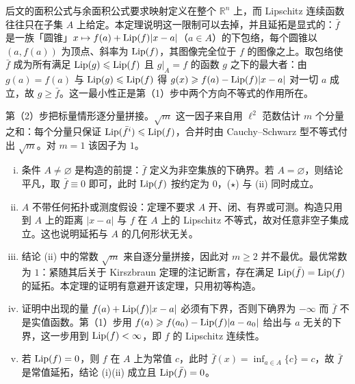 \documentclass[../../main.tex]{subfiles}%
\begin{document}
\begin{remark}\label{remark:ch03-thm-3-1-动机}
后文的面积公式与余面积公式要求映射定义在整个 $\mathbb{R}^n$ 上，而 Lipschitz 连续函数往往只在子集 $A$ 上给定。本定理说明这一限制可以去掉，并且延拓是显式的：$\bar f$ 是一族「圆锥」$x\mapsto f(a)+\operatorname{Lip}(f)\lvert x-a\rvert$（$a\in A$）的下包络，每个圆锥以 $(a,f(a))$ 为顶点、斜率为 $\operatorname{Lip}(f)$，其图像完全位于 $f$ 的图像之上。取包络使 $\bar f$ 成为所有满足 $\operatorname{Lip}(g)\leqslant\operatorname{Lip}(f)$ 且 $g|_A=f$ 的函数 $g$ 之下的最大者：由 $g(a)=f(a)$ 与 $\operatorname{Lip}(g)\leqslant\operatorname{Lip}(f)$ 得 $g(x)\geqslant f(a)-\operatorname{Lip}(f)\lvert x-a\rvert$ 对一切 $a$ 成立，故 $g\geqslant\bar f$。这一最小性正是第（1）步中两个方向不等式的作用所在。

第（2）步把标量情形逐分量拼接。$\sqrt{m}$ 这一因子来自用 $\ell^2$ 范数估计 $m$ 个分量之和：每个分量只保证 $\operatorname{Lip}(\bar f^i)\leqslant\operatorname{Lip}(f)$，合并时由 Cauchy--Schwarz 型不等式付出 $\sqrt{m}$。对 $m=1$ 该因子为 $1$。
\end{remark}

\begin{remark}\label{remark:ch03-thm-3-1-条件}
\begin{enumerate}[(i)]
\item 条件 $A\neq\varnothing$ 是构造的前提：$\bar f$ 定义为非空集族的下确界。若 $A=\varnothing$，则结论平凡，取 $\bar f\equiv0$ 即可，此时 $\operatorname{Lip}(f)$ 按约定为 $0$，($\star$) 与 (ii) 同时成立。
\item $A$ 不带任何拓扑或测度假设：定理不要求 $A$ 开、闭、有界或可测。构造只用到 $A$ 上的距离 $\lvert x-a\rvert$ 与 $f$ 在 $A$ 上的 Lipschitz 不等式，故对任意非空子集成立。这也说明延拓与 $A$ 的几何形状无关。
\item 结论 (ii) 中的常数 $\sqrt{m}$ 来自逐分量拼接，因此对 $m\geqslant2$ 并不最优。最优常数为 $1$：紧随其后关于 Kirszbraun 定理的注记断言，存在满足 $\operatorname{Lip}(\bar f)=\operatorname{Lip}(f)$ 的延拓。本定理的证明有意避开该定理，只用初等构造。
\item 证明中出现的量 $f(a)+\operatorname{Lip}(f)\lvert x-a\rvert$ 必须有下界，否则下确界为 $-\infty$ 而 $\bar f$ 不是实值函数。第（1）步用 $f(a)\geqslant f(a_0)-\operatorname{Lip}(f)\lvert a-a_0\rvert$ 给出与 $a$ 无关的下界，这一步用到 $\operatorname{Lip}(f)<\infty$，即 $f$ 的 Lipschitz 连续性。
\item 若 $\operatorname{Lip}(f)=0$，则 $f$ 在 $A$ 上为常值 $c$，此时 $\bar f(x)=\inf_{a\in A}\{c\}=c$，故 $\bar f$ 是常值延拓，结论 (i)(ii) 成立且 $\operatorname{Lip}(\bar f)=0$。
\end{enumerate}
\end{remark}
\end{document}
